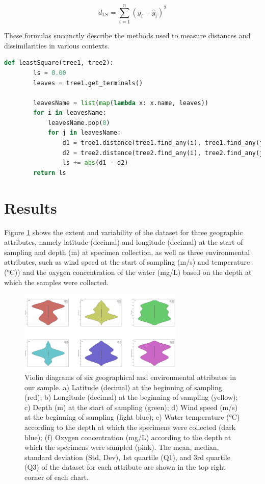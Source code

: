 \[ d_{\text{LS}} = \sum_{i=1}^{n} (y_i - \hat{y}_i)^2 \]

These formulas succinctly describe the methods used to measure distances and dissimilarities in various contexts.

\begin{lstlisting}[label=lst:LeastSquare,language=Python,caption=Python script for calculating the Least-Square distance using the ete3 package in aPhyloGeo package]
    def leastSquare(tree1, tree2):
        ls = 0.00
        leaves = tree1.get_terminals()

        leavesName = list(map(lambda x: x.name, leaves))
        for i in leavesName:
            leavesName.pop(0)
            for j in leavesName:
                d1 = tree1.distance(tree1.find_any(i), tree1.find_any(j))
                d2 = tree2.distance(tree2.find_any(i), tree2.find_any(j))
                ls += abs(d1 - d2)
        return ls
\end{lstlisting}

\section{Results}\label{results}

Figure \ref{fig:fig1} shows the extent and variability of the dataset for three geographic attributes, namely latitude (decimal) and longitude (decimal) at the start of sampling and depth (m) at specimen collection, as well as three environmental attributes, such as wind speed at the start of sampling (m/s) and temperature (°C)) and the oxygen concentration of the water (mg/L) based on the depth at which the samples were collected.

\begin{figure}[]
    \centering
    \includegraphics[width=0.7\textwidth]{figure1.jpg}
    \caption{Violin diagrams of six geographical and environmental attributes in our sample. a) Latitude (decimal) at the beginning of sampling (red); b) Longitude (decimal) at the beginning of sampling (yellow); c) Depth (m) at the start of sampling (green); d) Wind speed (m/s) at the beginning of sampling (light blue); e) Water temperature (°C) according to the depth at which the specimens were collected (dark blue); (f) Oxygen concentration (mg/L) according to the depth at which the specimens were sampled (pink). The mean, median, standard deviation (Std, Dev), 1st quartile (Q1), and 3rd quartile (Q3) of the dataset for each attribute are shown in the top right corner of each chart. \label{fig:fig1}}
\end{figure}

